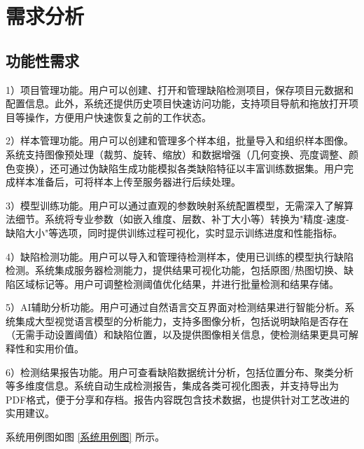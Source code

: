 \documentclass[
  ]{njuthesis}
\begin{document}
\section{需求分析}

\subsection{功能性需求}

1）项目管理功能。用户可以创建、打开和管理缺陷检测项目，保存项目元数据和配置信息。此外，系统还提供历史项目快速访问功能，支持项目导航和拖放打开项目等操作，方便用户快速恢复之前的工作状态。

2）样本管理功能。用户可以创建和管理多个样本组，批量导入和组织样本图像。系统支持图像预处理（裁剪、旋转、缩放）和数据增强（几何变换、亮度调整、颜色变换），还可通过伪缺陷生成功能模拟各类缺陷特征以丰富训练数据集。用户完成样本准备后，可将样本上传至服务器进行后续处理。

3）模型训练功能。用户可以通过直观的参数映射系统配置模型，无需深入了解算法细节。系统将专业参数（如嵌入维度、层数、补丁大小等）转换为"精度-速度-缺陷大小"等选项，同时提供训练过程可视化，实时显示训练进度和性能指标。

4）缺陷检测功能。用户可以导入和管理待检测样本，使用已训练的模型执行缺陷检测。系统集成服务器检测能力，提供结果可视化功能，包括原图/热图切换、缺陷区域标记等。用户可调整检测阈值优化结果，并进行批量检测和结果存储。

5）AI辅助分析功能。用户可通过自然语言交互界面对检测结果进行智能分析。系统集成大型视觉语言模型的分析能力，支持多图像分析，包括说明缺陷是否存在（无需手动设置阈值）和缺陷位置，以及提供图像相关信息，使检测结果更具可解释性和实用价值。

6）检测结果报告功能。用户可查看缺陷数据统计分析，包括位置分布、聚类分析等多维度信息。系统自动生成检测报告，集成各类可视化图表，并支持导出为PDF格式，便于分享和存档。报告内容既包含技术数据，也提供针对工艺改进的实用建议。

系统用例图如图 \ref{系统用例图} 所示。
\end{document}
